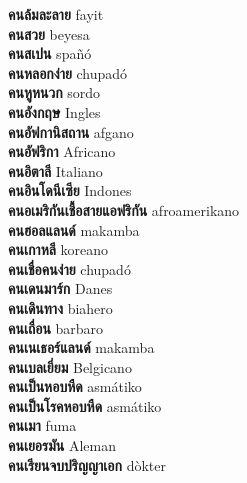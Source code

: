 \textbf{ คนล้มละลาย  } fayit \\
\textbf{ คนสวย  } beyesa \\
\textbf{ คนสเปน  } spañó \\
\textbf{ คนหลอกง่าย  } chupadó \\
\textbf{ คนหูหนวก  } sordo \\
\textbf{ คนอังกฤษ  } Ingles \\
\textbf{ คนอัฟกานิสถาน  } afgano \\
\textbf{ คนอัฟริกา  } Africano \\
\textbf{ คนอิตาลี  } Italiano \\
\textbf{ คนอินโดนีเซีย  } Indones \\
\textbf{ คนอเมริกันเชื้อสายแอฟริกัน  } afroamerikano \\
\textbf{ คนฮอลแลนด์  } makamba \\
\textbf{ คนเกาหลี  } koreano \\
\textbf{ คนเชื่อคนง่าย  } chupadó \\
\textbf{ คนเดนมาร์ก  } Danes \\
\textbf{ คนเดินทาง  } biahero \\
\textbf{ คนเถื่อน  } barbaro \\
\textbf{ คนเนเธอร์แลนด์  } makamba \\
\textbf{ คนเบลเยี่ยม  } Belgicano \\
\textbf{ คนเป็นหอบหืด  } asmátiko \\
\textbf{ คนเป็นโรคหอบหืด  } asmátiko \\
\textbf{ คนเมา  } fuma \\
\textbf{ คนเยอรมัน  } Aleman \\
\textbf{ คนเรียนจบปริญญาเอก  } dòkter \\
